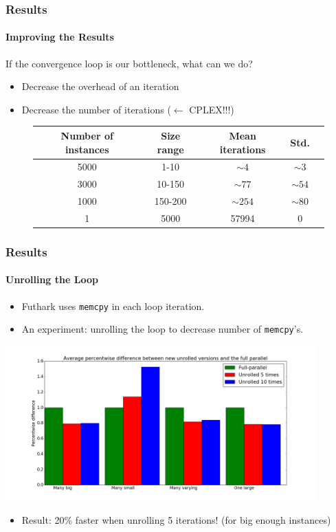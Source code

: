 \documentclass{beamer}
\renewcommand{\emph}[1]{\textcolor{structure}{#1}}
\begin{document}
\begin{frame}
\frametitle{Results}
\framesubtitle{Improving the Results}

If the convergence loop is our bottleneck, what can we do?

\begin{itemize}
\item Decrease the overhead of an iteration
\item Decrease the number of iterations ($\leftarrow$ CPLEX!!!)
\end{itemize}

\begin{figure}
\begin{tabular}{|c|c|c|c|c|}
\hline
\textbf{Number of instances} & \textbf{Size range} & \textbf{Mean iterations} & \textbf{Std.} \\\hline
5000 & 1-10 & $\sim 4$ & $\sim 3$ \\\hline
3000 & 10-150 & $\sim 77$ & $\sim 54$ \\\hline
1000 & 150-200 & $\sim 254$ & $\sim 80$ \\\hline
1 & 5000 & 57994 & 0 \\\hline
\end{tabular}
\end{figure}
\end{frame}

\begin{frame}[fragile]
\frametitle{Results}
\framesubtitle{Unrolling the Loop}

\begin{itemize}
\item Futhark uses \texttt{memcpy} in each loop iteration.

\item \emph{An experiment}: unrolling the loop to decrease number of \texttt{memcpy}'s.
\end{itemize}
\pause
\centering
\includegraphics[width=0.9\textwidth]{../Doc/figures/unrolling}

\begin{itemize}
\item \emph{Result}: 20\% faster when unrolling 5 iterations! {\tiny(for big enough instances)}
\end{itemize}
\end{frame}
\end{document}
